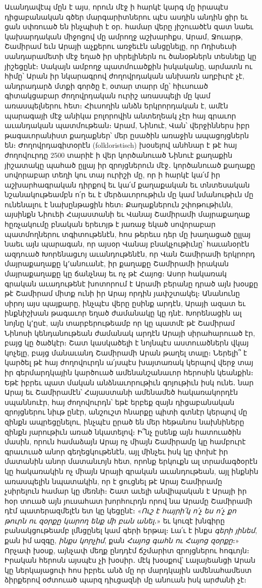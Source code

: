 \documentclass{article}
\begin{document}
{Աւանդավէպ մըն է այս, որուն մէջ ի հարկէ կարգ մը իրապէս դիցաբանական գծեր մարգարիտներու պէս ասդին անդին ցիր եւ ցան սփռուած են ինչպիսի է օր․ համար վերը յիշուածէն զատ նաեւ կախարդական միջոցով մը ամրողջ աշխարհքս, Արամ, Ջուարթ, Շամիրամ եւն Արայի աչքերու առջեւէն անցընելը, որ Ոդիսեւսի սանդարամետի մէջ եղած իր սիրելիներն ու ծանօթներն տեսնելը կը յիշեցընէ։ Սակայն ամբողջ պատմուածքին իսկականը, արմատն ու հիմը՝ Արան իր նկարագրով ժողովրդական անխառն աղբիւրէ չէ, անդրադարձ մտքի գործը է, օտար տարր մը՝ հիւսուած գիտակցաբար ժողովրդական ուրիշ առասպելի մը կամ առասպելներու հետ։ Հիւսողին անձն երկրորդական է, ամէն պարագայի մէջ անիկա բոլորովին անտեղեակ չէր հայ գրաւոր աւանդական պատմութեան։ Արամ, Նինուէ, Վան՝ վերջիններս իբր թագաւորանիստ քաղաքներ՝ մեր ըսածին առաջին ապացոյցներն են։ Ժողովրդագիտօրէն (folkloristisch) խօսելով անհնար է թէ հայ ժողովուրդը 2500 տարիէ ի վեր կործանուած Նինուէ քաղաքին յիշատակը պահած ըլլայ իր զրոյցներուն մէջ․ կործանուած քաղաքը սովորաբար տեղի կու տայ ուրիշի մը, որ ի հարկէ կա՛մ իր աշխարհագրական դիրքով եւ կա՛մ քաղաքական եւ տնտեսական նշանակութեամբն ո՛ր եւ է մերձաւորութիւն մը կամ նմանութիւն մը ունենալու է նախընթացին հետ։ Քաղաքներուն շփոթութիւնն, այսինքն Նիուեի Հայաստանի եւ Վանայ Շամիրամի մայրաքաղաք հըռչակումը բնական երեւոյթ է յառաջ եկած սովորաբար պատմողներու տգիտութենէն, հոս թերեւս դեր մը խաղացած ըլլայ նաեւ այն պարագան, որ այսօր Վանայ բնակչութիւնը՝ հաւանօրէն ազդուած Խորենացւոյ աւանդութենէն, որ Վան Շամիրամի երկրորդ մայրաքաղաքը կ՚անուանէ, իր քաղաքը Շամիրամի իրական մայրաքաղաքը կը ճանչնայ եւ ոչ թէ Հայոց։ Ասոր հակառակ գրական աւադութենէ խոտորում է Արամի բերանը դրած այն խօսքը թէ Շամիրամ միտք ունի իր Արայ որդին յափշտակել։ Անանունը սիրոյ այս պայքարը, ինչպէս վերը ըսինք արդէն, Արայի ազատ եւ ինքնիշխան թագաւոր եղած ժամանակը կը դնէ․ Խորենացին ալ նոյնը կ՚ըսէ, այն տարբերութեամբ որ կը պատմէ թէ Շամիրամ Նինոսի կենդանութեան ժամանակ արդէն Արայի սիրահարուած էր, բայց կը ծածկէր։ Շատ կասկածելի է նոյնպէս աստուածներն վկայ կոչելը, բայց մանաւանդ Շամիրամի Արան թաղել տալը։ Ներելի՞ է կարծել թէ հայ ժողովուրդն ա՛յսպէս խայտառակ կերպով վերջ տայ իր գերմարդկային կարծուած ամենանշանաւոր հերոսին կեանքին։ Եթէ իբրեւ պատ մական անձնաւորութիւն գոյութիւն իսկ ունե․ նար Արայ եւ Շամիրամէն՝ Հայաստանի ամենամեծ հակառակորդէն սպաննուէր, հայ ժողովուրդն՝ եթէ երբեք զայն դիցաբանական զրոյցներու նիւթ ընէր, անշուշտ հնարքը պիտի գտնէր կերպով մը զինքն ապրեցընելու, ինչպէս ըրած են մեր հեթանոս նախնիները զինքն յարութիւն առած նկատելով։ Ի՞նչ ըսենք այն հատուածին մասին, որուն համաձայն Արայ ոչ միայն Շամիրամը կը համբուրէ գրաւուած անոր գեղեցկութենէն, այլ մինչեւ իսկ կը փոխէ իր մատանին անոր մատանւոյն հետ, որոնք երկուքն ալ տրամագծօրէն կը հակառակին ոչ միայն Արայի գրական աւանդութեան, այլ ինքնին առասպելին նպատակին, որ է ցուցնել թէ Արայ Շամիրամը չսիրելուն համար կը մեռնի։ Շատ աւելի անվիպական է Արայի իր հօր տուած այն յուսահատ խորհուրդն որով նա Արամը Շամիրամի դէմ պատերազմելէն ետ կը կեցընէ։ «\emph{Ուշ է հայրի՛կ ո՛չ ես ո՛չ քո թուրն ու զօրքը կարող ենք մի բան անել}․» եւ կուզէ խնգիրը բանակցութեամբ լմնցընել կամ գերի երթալ։ Լա՛ւ է ինքս \emph{գերի յինեմ}, քան իմ ազգը, \emph{ինքս կորչիմ}, քան \emph{Հայոց գահն ու Հայոց զօրքը}։» Որչափ խօսք, այնչափ մեղք ընդդէմ ճշմարիտ զրոյցներու հոգւոյն։ Իրական հերոսն այսպէս չի խօսիր․ մէկ խօսքով՝ Լալայեանցի Արան կը ներկայացուի հոս իբրեւ անձ մը որ մարդկային ամենահամեստ ձիրքերով օժտուած պարզ դիւցազնի մը անուան իսկ արժանի չէ։

}
\end{document}
